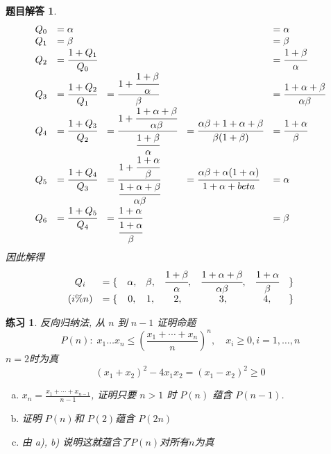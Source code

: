 \documentclass[mode=geye]{elegantnote}
\newtheorem{exercise}{练习}
\newtheorem{answer}{题目解答}
\begin{document}
\begin{answer}
	\begin{equation*}
		\begin{array}{lllll}
			Q_0 &= \alpha & & &= \alpha\\
			Q_1 &= \beta  & & &= \beta\\
			Q_2 &= \cfrac{1+Q_1}{Q_0} & &&= \cfrac{1+\beta}{\alpha} \\
			Q_3 &= \cfrac{1+Q_2}{Q_1} &= \cfrac{1+\cfrac{1+\beta}{\alpha}}{\beta} 
			&&= \cfrac{1+\alpha+\beta}{\alpha\beta} \\
			Q_4 &= \cfrac{1+Q_3}{Q_2} 
			&= \cfrac{1+\cfrac{1+\alpha+\beta}{\alpha\beta} }{\cfrac{1+\beta}{\alpha}}
			&= \cfrac{\alpha\beta+1+\alpha+\beta}{\beta(1+\beta)} 
			&= \cfrac{1+\alpha}{\beta} \\
			Q_5 &= \cfrac{1+Q_4}{Q_3} 
			&= \cfrac{1+\cfrac{1+\alpha}{\beta}}{ \cfrac{1+\alpha+\beta}{\alpha\beta}}
			&= \cfrac{\alpha\beta+\alpha(1+\alpha)}{1+\alpha+beta} &= \alpha \\
			Q_6 &= \cfrac{1+Q_5}{Q_4} &= \cfrac{1+\alpha}{\cfrac{1+\alpha}{\beta}} & &= \beta\\
		\end{array}
	\end{equation*}
	因此解得 
	\begin{equation*}
		\begin{array}{clcccccc}
			Q_i &= \{ &\alpha ,& \beta ,& \cfrac{1+\beta}{\alpha} ,& \cfrac{1+\alpha+\beta}{\alpha\beta} ,& \cfrac{1+\alpha}{\beta} & \}\\
			(i\%n) &= \{ & 0 ,& 1 ,& 2 ,& 3 ,& 4 ,& \}\\
		\end{array}
	\end{equation*}
\end{answer}	

\begin{exercise}
		反向归纳法, 从 $ n $ 到 $  n-1 $ 证明命题
	\begin{equation*}
		P(n) : \; x_{1} \dots x_{n} \leqslant \left( \frac{x_{1}+\cdots+x_{n}}{n}\right) ^n, \quad x_i \geqslant 0, i=1,\dots,n
	\end{equation*}
	$ n=2 $时为真 
	\begin{equation*}
		(x_{1}+x_{2})^2-4x_{1}x_{2} = (x_{1}-x_{2})^2 \geqslant 0
	\end{equation*}
	\begin{enumerate}[a)]
		\item $ x_n = \frac{x_{1}+\cdots+x_{n-1}}{n-1} $, 证明只要 $ n>1 $ 时 $ P(n) $ 蕴含 $ P(n-1) $.
		\item 证明 $ P(n) $和 $ P(2) $蕴含 $ P(2n) $
		\item 由 a), b) 说明这就蕴含了$ P(n) $对所有$ n $为真
	\end{enumerate}
\end{exercise}
\end{document}
